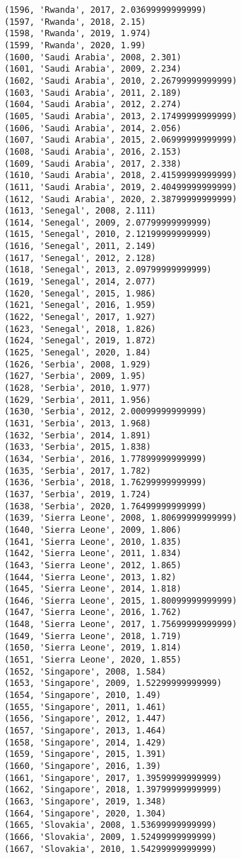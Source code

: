 \documentclass[11pt]{article}
\begin{document}
\begin{Verbatim}[commandchars=\\\{\}]
(1596, 'Rwanda', 2017, 2.03699999999999)
(1597, 'Rwanda', 2018, 2.15)
(1598, 'Rwanda', 2019, 1.974)
(1599, 'Rwanda', 2020, 1.99)
(1600, 'Saudi Arabia', 2008, 2.301)
(1601, 'Saudi Arabia', 2009, 2.234)
(1602, 'Saudi Arabia', 2010, 2.26799999999999)
(1603, 'Saudi Arabia', 2011, 2.189)
(1604, 'Saudi Arabia', 2012, 2.274)
(1605, 'Saudi Arabia', 2013, 2.17499999999999)
(1606, 'Saudi Arabia', 2014, 2.056)
(1607, 'Saudi Arabia', 2015, 2.06999999999999)
(1608, 'Saudi Arabia', 2016, 2.153)
(1609, 'Saudi Arabia', 2017, 2.338)
(1610, 'Saudi Arabia', 2018, 2.41599999999999)
(1611, 'Saudi Arabia', 2019, 2.40499999999999)
(1612, 'Saudi Arabia', 2020, 2.38799999999999)
(1613, 'Senegal', 2008, 2.111)
(1614, 'Senegal', 2009, 2.07799999999999)
(1615, 'Senegal', 2010, 2.12199999999999)
(1616, 'Senegal', 2011, 2.149)
(1617, 'Senegal', 2012, 2.128)
(1618, 'Senegal', 2013, 2.09799999999999)
(1619, 'Senegal', 2014, 2.077)
(1620, 'Senegal', 2015, 1.986)
(1621, 'Senegal', 2016, 1.959)
(1622, 'Senegal', 2017, 1.927)
(1623, 'Senegal', 2018, 1.826)
(1624, 'Senegal', 2019, 1.872)
(1625, 'Senegal', 2020, 1.84)
(1626, 'Serbia', 2008, 1.929)
(1627, 'Serbia', 2009, 1.95)
(1628, 'Serbia', 2010, 1.977)
(1629, 'Serbia', 2011, 1.956)
(1630, 'Serbia', 2012, 2.00099999999999)
(1631, 'Serbia', 2013, 1.968)
(1632, 'Serbia', 2014, 1.891)
(1633, 'Serbia', 2015, 1.838)
(1634, 'Serbia', 2016, 1.77899999999999)
(1635, 'Serbia', 2017, 1.782)
(1636, 'Serbia', 2018, 1.76299999999999)
(1637, 'Serbia', 2019, 1.724)
(1638, 'Serbia', 2020, 1.76499999999999)
(1639, 'Sierra Leone', 2008, 1.80699999999999)
(1640, 'Sierra Leone', 2009, 1.806)
(1641, 'Sierra Leone', 2010, 1.835)
(1642, 'Sierra Leone', 2011, 1.834)
(1643, 'Sierra Leone', 2012, 1.865)
(1644, 'Sierra Leone', 2013, 1.82)
(1645, 'Sierra Leone', 2014, 1.818)
(1646, 'Sierra Leone', 2015, 1.80099999999999)
(1647, 'Sierra Leone', 2016, 1.762)
(1648, 'Sierra Leone', 2017, 1.75699999999999)
(1649, 'Sierra Leone', 2018, 1.719)
(1650, 'Sierra Leone', 2019, 1.814)
(1651, 'Sierra Leone', 2020, 1.855)
(1652, 'Singapore', 2008, 1.584)
(1653, 'Singapore', 2009, 1.52299999999999)
(1654, 'Singapore', 2010, 1.49)
(1655, 'Singapore', 2011, 1.461)
(1656, 'Singapore', 2012, 1.447)
(1657, 'Singapore', 2013, 1.464)
(1658, 'Singapore', 2014, 1.429)
(1659, 'Singapore', 2015, 1.391)
(1660, 'Singapore', 2016, 1.39)
(1661, 'Singapore', 2017, 1.39599999999999)
(1662, 'Singapore', 2018, 1.39799999999999)
(1663, 'Singapore', 2019, 1.348)
(1664, 'Singapore', 2020, 1.304)
(1665, 'Slovakia', 2008, 1.53699999999999)
(1666, 'Slovakia', 2009, 1.52499999999999)
(1667, 'Slovakia', 2010, 1.54299999999999)

\end{Verbatim}
\end{document}
